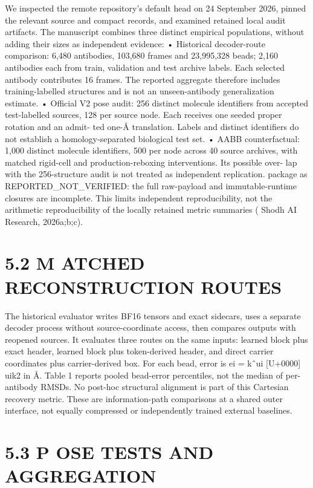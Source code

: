 \documentclass[11pt]{article}
\begin{document}
We inspected the remote repository’s default head on 24 September 2026, pinned the relevant source
and compact records, and examined retained local audit artifacts. The manuscript combines three
distinct empirical populations, without adding their sizes as independent evidence:
• Historical decoder-route comparison: 6,480 antibodies, 103,680 frames and 23,995,328
beads; 2,160 antibodies each from train, validation and test archive labels. Each selected
antibody contributes 16 frames. The reported aggregate therefore includes training-labelled
structures and is not an unseen-antibody generalization estimate.
• Official V2 pose audit: 256 distinct molecule identifiers from accepted test-labelled
sources, 128 per source node. Each receives one seeded proper rotation and an admit-
ted one-Å translation. Labels and distinct identifiers do not establish a homology-separated
biological test set.
• AABB counterfactual: 1,000 distinct molecule identifiers, 500 per node across 40 source
archives, with matched rigid-cell and production-reboxing interventions. Its possible over-
lap with the 256-structure audit is not treated as independent replication.
package as REPORTED\_NOT\_VERIFIED: the full raw-payload and immutable-runtime closures
are incomplete. This limits independent reproducibility, not the arithmetic reproducibility of the
locally retained metric summaries ( Shodh AI Research, 2026a;b;c).

\section*{5.2 M ATCHED RECONSTRUCTION ROUTES}

The historical evaluator writes BF16 tensors and exact sidecars, uses a separate decoder process
without source-coordinate access, then compares outputs with reopened sources. It evaluates three
routes on the same inputs: learned block plus exact header, learned block plus token-derived header,
and direct carrier coordinates plus carrier-derived box. For each bead, error is ei = kˆui [U+0000] uik2
in Å. Table 1 reports pooled bead-error percentiles, not the median of per-antibody RMSDs. No
post-hoc structural alignment is part of this Cartesian recovery metric. These are information-path
comparisons at a shared outer interface, not equally compressed or independently trained external
baselines.

\section*{5.3 P OSE TESTS AND AGGREGATION}
\end{document}
